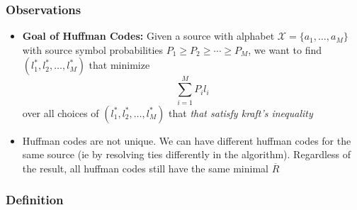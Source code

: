 \documentclass{article}
\begin{document}
\subsubsection{Observations}
\begin{itemize}
    \item \textbf{Goal of Huffman Codes:} Given a source with alphabet \(\mathcal{X} = \{a_1, \ldots, a_M\}\) with source symbol probabilities \(P_1\geq P_2 \geq \cdots \geq P_M\), we want to find
    \((l_1^*, l_2^*, \ldots, l_M^*)\) that minimize
    \[\sum_{i=1}^M P_i l_i\]
    over all choices of \((l_1^*, l_2^*, \ldots, l_M^*)\) that \textit{that satisfy kraft's inequality}
    \item Huffman codes are not unique. We can have different huffman codes for the same source (ie by resolving ties differently in the algorithm). Regardless of the result, all huffman codes still have the same minimal \(\overline{R}\)
\end{itemize}
\subsubsection{Definition}
\end{document}
